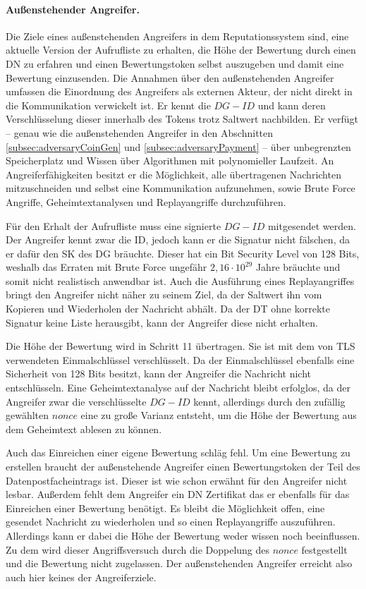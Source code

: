 \documentclass[
	fontsize=11pt,
	headings=small,
	parskip=half,           %
	bibliography=totoc,
	numbers=noenddot,       %
	open=any,               %
]{scrreprt}
\begin{document}
\paragraph{Außenstehender Angreifer.}
Die Ziele eines außenstehenden Angreifers in dem Reputationssystem sind, eine aktuelle Version der Aufrufliste zu erhalten, die Höhe der Bewertung durch einen DN zu erfahren und einen Bewertungstoken selbst auszugeben und damit eine Bewertung einzusenden. Die Annahmen über den außenstehenden Angreifer umfassen die Einordnung des Angreifers als externen Akteur, der nicht direkt in die Kommunikation verwickelt ist. Er kennt die $DG-ID$ und kann deren Verschlüsselung dieser innerhalb des Tokens trotz Saltwert nachbilden. Er verfügt -- genau wie die außenstehenden Angreifer in den Abschnitten \ref{subsec:adversaryCoinGen} und \ref{subsec:adversaryPayment} -- über unbegrenzten Speicherplatz und Wissen über Algorithmen mit polynomieller Laufzeit. An Angreiferfähigkeiten besitzt er die Möglichkeit, alle übertragenen Nachrichten mitzuschneiden und selbst eine Kommunikation aufzunehmen, sowie Brute Force Angriffe, Geheimtextanalysen und Replayangriffe durchzuführen.

Für den Erhalt der Aufrufliste muss eine signierte $DG-ID$ mitgesendet werden. Der Angreifer kennt zwar die ID, jedoch kann er die Signatur nicht fälschen, da er dafür den SK des DG bräuchte. Dieser hat ein Bit Security Level von 128 Bits, weshalb das Erraten mit Brute Force ungefähr $2,16\cdot10^{29}$ Jahre bräuchte und somit nicht realistisch anwendbar ist. Auch die Ausführung eines Replayangriffes bringt den Angreifer nicht näher zu seinem Ziel, da der Saltwert ihn vom Kopieren und Wiederholen der Nachricht abhält. Da der DT ohne korrekte Signatur keine Liste herausgibt, kann der Angreifer diese nicht erhalten.

Die Höhe der Bewertung wird in Schritt 11 übertragen. Sie ist mit dem von TLS verwendeten Einmalschlüssel verschlüsselt. Da der Einmalschlüssel ebenfalls eine Sicherheit von 128 Bits besitzt, kann der Angreifer die Nachricht nicht entschlüsseln. Eine Geheimtextanalyse auf der Nachricht bleibt erfolglos, da der Angreifer zwar die verschlüsselte $DG-ID$ kennt, allerdings durch den zufällig gewählten $nonce$ eine zu große Varianz entsteht, um die Höhe der Bewertung aus dem Geheimtext ablesen zu können.

Auch das Einreichen einer eigene Bewertung schläg fehl. Um eine Bewertung zu erstellen braucht der außenstehende Angreifer einen Bewertungstoken der Teil des Datenpostfacheintrags ist. Dieser ist wie schon erwähnt für den Angreifer nicht lesbar. Außerdem fehlt dem Angreifer ein DN Zertifikat das er ebenfalls für das Einreichen einer Bewertung benötigt. Es bleibt die Möglichkeit offen, eine gesendet Nachricht zu wiederholen und so einen Replayangriffe auszuführen. Allerdings kann er dabei die Höhe der Bewertung weder wissen noch beeinflussen. Zu dem wird dieser Angriffsversuch durch die Doppelung des $nonce$ festgestellt und die Bewertung nicht zugelassen. Der außenstehenden Angreifer erreicht also auch hier keines der Angreiferziele.\\
\end{document}
